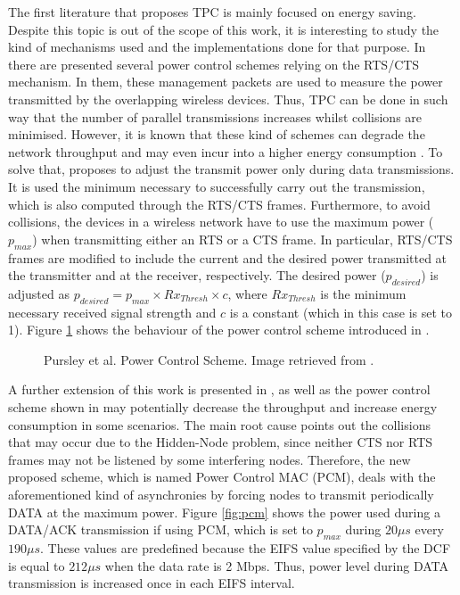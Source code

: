 \documentclass[12pt, a4paper,twoside]{tesi_upf}
\begin{document}
				The first literature that proposes TPC is mainly focused on energy saving. Despite this topic is out of the scope of this work, it is interesting to study the kind of mechanisms used and the implementations done for that purpose. In \cite{agarwal2001distributed, karn1990maca} there are presented several power control schemes relying on the RTS/CTS mechanism. In them, these management packets are used to measure the power transmitted by the overlapping wireless devices. Thus, TPC can be done in such way that the number of parallel transmissions increases whilst collisions are minimised. However, it is known that these kind of schemes can degrade the network throughput and may even incur into a higher energy consumption \cite{ebert1999combined}. To solve that, \cite{pursley2000energy} proposes to adjust the transmit power only during data transmissions. It is used the minimum necessary to successfully carry out the transmission, which is also computed through the RTS/CTS frames. Furthermore, to avoid collisions, the devices in a wireless network have to use the maximum power ($p_{max}$) when transmitting either an RTS or a CTS frame. In particular, RTS/CTS frames are modified to include the current and the desired power transmitted at the transmitter and at the receiver, respectively. The desired power ($p_{desired}$) is adjusted as $p_{desired} = p_{max} \times Rx_{Thresh} \times c$, where $Rx_{Thresh}$ is the minimum necessary received signal strength and $c$ is a constant (which in this case is set to 1). Figure \ref{fig:basic_tpc} shows the behaviour of the power control scheme introduced in \cite{pursley2000energy}.	
				\begin{figure}[h!]
					\centering
					\caption{Pursley et al. Power Control Scheme. Image retrieved from \cite{pursley2000energy}.}
					\label{fig:basic_tpc}
				\end{figure}				
				A further extension of this work is presented in \cite{jung2002power}, as well as the power control scheme shown in \cite{pursley2000energy} may potentially decrease the throughput and increase energy consumption in some scenarios. The main root cause points out the collisions that may occur due to the Hidden-Node problem, since neither CTS nor RTS frames may not be listened by some interfering nodes. Therefore, the new proposed scheme, which is named Power Control MAC (PCM), deals with the aforementioned kind of asynchronies by forcing nodes to transmit periodically DATA at the maximum power. Figure \ref{fig:pcm} shows the power used during a DATA/ACK transmission if using PCM, which is set to $p_{max}$ during $20 \mu s$ every $190 \mu s$. These values are predefined because the EIFS value specified by the DCF is equal to $212 \mu s$ when the data rate is 2 Mbps. Thus, power level during DATA transmission is increased once in each EIFS interval.
\end{document}
